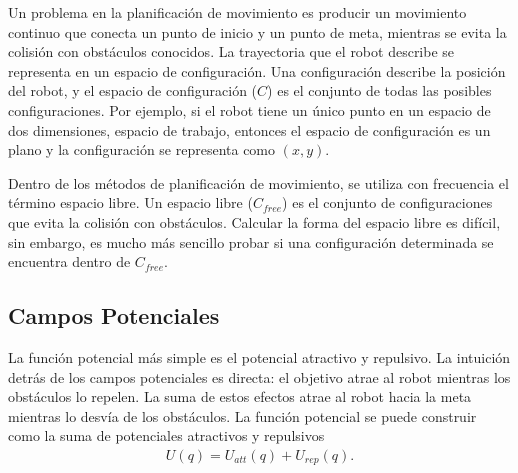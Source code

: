 Un problema en la planificaci\'on de movimiento es producir un movimiento 
continuo que conecta un punto de inicio y un punto de meta, mientras se evita 
la colisi\'on con obst\'aculos conocidos. La trayectoria que el robot describe 
se representa en un espacio de configuraci\'on. Una configuraci\'on describe 
la posici\'on del robot, y el espacio de configuraci\'on ($C$) es el conjunto 
de todas las posibles configuraciones. Por ejemplo, si el robot tiene 
un \'unico punto en un espacio de dos dimensiones, espacio de trabajo, entonces 
el espacio de configuraci\'on es un plano y la configuraci\'on se representa 
como $(x,y)$.

Dentro de los m\'etodos de planificaci\'on de movimiento, se utiliza con frecuencia 
el t\'ermino espacio libre. Un espacio libre ($C_{free}$) es el conjunto de 
configuraciones que evita la colisi\'on con obst\'aculos. Calcular la forma 
del espacio libre es dif\'icil, sin embargo, es mucho m\'as sencillo probar si 
una configuraci\'on determinada se encuentra dentro de $C_{free}$. 


\subsection{Campos Potenciales}
La funci\'on potencial m\'as simple es el potencial atractivo y repulsivo. La 
intuici\'on detr\'as de los campos potenciales es directa: el objetivo atrae al 
robot mientras los obst\'aculos lo repelen. La suma de estos efectos atrae al 
robot hacia la meta mientras lo desvía de los obst\'aculos. La funci\'on 
potencial se puede construir como la suma de potenciales atractivos y repulsivos
\begin{align}
\label{eqn:potetialField}
U(q) = U_{att}(q) + U_{rep}(q).
\end{align}
